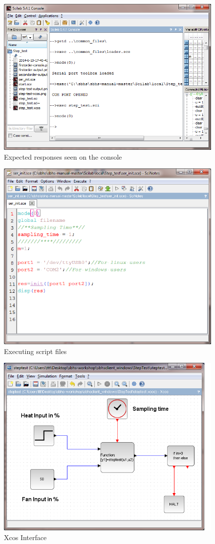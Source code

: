 \begin{figure}
\centering
\includegraphics[width=0.7\linewidth]{using-sbhs/commands.png}
\caption{Expected responses seen on the console}
\label{loader}
\end{figure}


\begin{figure}
\centering
\includegraphics[width=0.7\linewidth]{using-sbhs/ser_init.png}
\caption{Executing script files}
\label{exec}
\end{figure}

\begin{figure}
\centering
\includegraphics[width=0.7\linewidth]{using-sbhs/xcos.png}
\caption{Xcos Interface}
\label{Xcosintr}
\end{figure}

